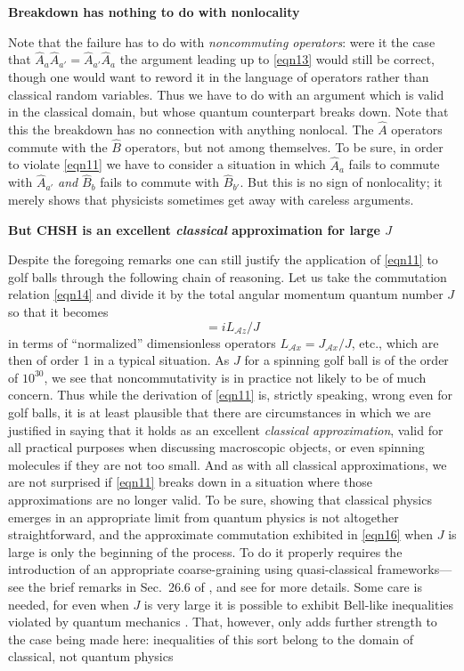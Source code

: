 \documentclass[12pt]{article} %
\def\outl#1{\par{\medskip\noindent\hspace*{.5cm}\bf
      \mathversion{bold}#1\mathversion{normal}\smallskip} }
\def\np{} \def\xa{} \def\xb{} \def\xn{} \def\xp{}
\def\outl#1{} \def\np{} \def\xa{} \def\xb{} \def\xn{} \def\xp{}
\def\outl#1{\par{\medskip\noindent\hspace*{.5cm}\bf
      \mathversion{bold}#1\mathversion{normal}\smallskip} }
\def\np{\newpage }\def\xn{\nopagebreak }\def\xp{\pagebreak }
\newcommand{\AM}{{\mathcal A}}
\begin{document}
\xb
\outl{Breakdown has nothing to do with nonlocality}
\xa


Note that the failure has to do with \emph{noncommuting operators}: were it
the case that $\hat A_a\hat A_{a'} =\hat A_{a'} \hat A_a$ the argument leading
up to \eqref{eqn13} would still be correct, though one would want to reword it
in the language of operators rather than classical random variables.  Thus we
have to do with an argument which is valid in the classical domain, but whose
quantum counterpart breaks down.  Note that this the breakdown has no
connection with anything nonlocal.  The $\hat A$ operators commute
with the $\hat B$ operators, but not among themselves.  To be sure, in order
to violate \eqref{eqn11} we have to consider a situation in which $\hat A_a$
fails to commute with $\hat A_{a'}$ \emph{and} $\hat B_b$ fails to commute
with $\hat B_{b'}$.  But this is no sign of nonlocality; it merely shows that
physicists sometimes get away with careless arguments.

\xb
\outl{But CHSH is an excellent \emph{classical} approximation for large $J$}
\xa


Despite the foregoing remarks one can still justify the application of
\eqref{eqn11} to golf balls through the following chain of reasoning. 
Let us take the commutation relation \eqref{eqn14}
and divide it by the total angular momentum
quantum number $J$ so that it becomes
\begin{equation}
  [L_{\AM x},L_{\AM y}] = i L_{\AM z}/J
\label{eqn16}
\end{equation}
in terms of ``normalized'' dimensionless operators $L_{\AM x}=J_{\AM x}/J$,
etc., which are then of order 1 in a typical situation.  As $J$ for a spinning
golf ball is of the order of $10^{30}$, we see that noncommutativity is in
practice not likely to be of much concern. Thus while the derivation of
\eqref{eqn11} is, strictly speaking, wrong even for golf balls, it is at least
plausible that there are circumstances in which we are justified in saying
that it holds as an excellent \emph{classical approximation}, valid for all
practical purposes when discussing macroscopic objects, or even spinning
molecules if they are not too small.  And as with all classical
approximations, we are not surprised if \eqref{eqn11} breaks down in a
situation where those approximations are no longer valid.  To be sure, showing
that classical physics emerges in an appropriate limit from quantum physics is
not altogether straightforward, and the approximate commutation exhibited in
\eqref{eqn16} when $J$ is large is only the beginning of the process.  To do
it properly requires the introduction of an appropriate coarse-graining using
quasi-classical frameworks---see the brief remarks in Sec.~26.6 of
\cite{Grff02c}, and see \cite{GMHr93} for more details.  Some care is needed,
for even when $J$ is very large it is possible to exhibit Bell-like
inequalities violated by quantum mechanics \cite{Mrmn80,GrMr83}.  That,
however, only adds further strength to the case being made here: inequalities
of this sort belong to the domain of classical, not quantum physics
\end{document}
